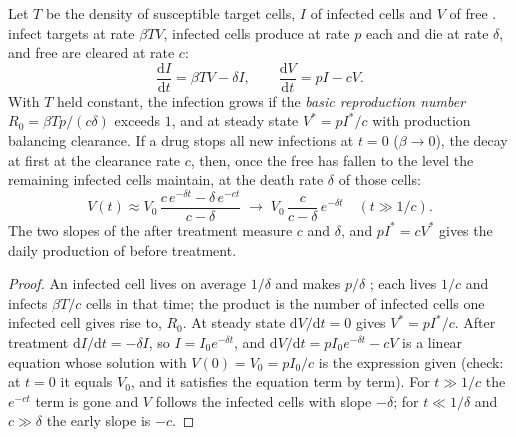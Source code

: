 \begin{theorem}\label{thm:b3:virology:dynamics}
Let $T$ be the density of susceptible target cells, $I$ of infected
cells and $V$ of free .  infect targets at rate $\beta TV$,
infected cells produce  at rate $p$ each and die at rate
$\delta$, and free  are cleared at rate $c$:
\[
\frac{\mathrm{d}I}{\mathrm{d}t} = \beta TV - \delta I, \qquad
\frac{\mathrm{d}V}{\mathrm{d}t} = pI - cV .
\]
With $T$ held constant, the infection grows if the \emph{basic
reproduction number} $R_{0} = \beta Tp/(c\delta)$ exceeds $1$, and at
steady state $V^{*} = p I^{*}/c$ with production balancing clearance.
If a drug stops all new infections at $t = 0$ ($\beta \to 0$), the
 decay at first at the clearance rate $c$, then, once the free
 has fallen to the level the remaining infected cells maintain, at
the death rate $\delta$ of those cells:
\[
V(t) \approx V_{0}\,\frac{c\,e^{-\delta t} - \delta\,e^{-ct}}{c - \delta}
\;\longrightarrow\; V_{0}\,\frac{c}{c-\delta}\,e^{-\delta t}
\quad (t \gg 1/c).
\]
The two slopes of the  after treatment measure $c$ and
$\delta$, and $pI^{*} = cV^{*}$ gives the daily production of 
before treatment.
\end{theorem}
\begin{proof}
An infected cell lives on average $1/\delta$ and makes $p/\delta$
; each  lives $1/c$ and infects $\beta T/c$ cells in that
time; the product is the number of infected cells one infected cell
gives rise to, $R_{0}$. At steady state $\mathrm{d}V/\mathrm{d}t = 0$
gives $V^{*} = pI^{*}/c$. After treatment $\mathrm{d}I/\mathrm{d}t =
-\delta I$, so $I = I_{0}e^{-\delta t}$, and $\mathrm{d}V/\mathrm{d}t =
pI_{0}e^{-\delta t} - cV$ is a linear equation whose solution with
$V(0) = V_{0} = pI_{0}/c$ is the expression given (check: at $t = 0$ it
equals $V_{0}$, and it satisfies the equation term by term). For $t
\gg 1/c$ the $e^{-ct}$ term is gone and $V$ follows the infected cells
with slope $-\delta$; for $t \ll 1/\delta$ and $c \gg \delta$ the early
slope is $-c$.
\end{proof}

